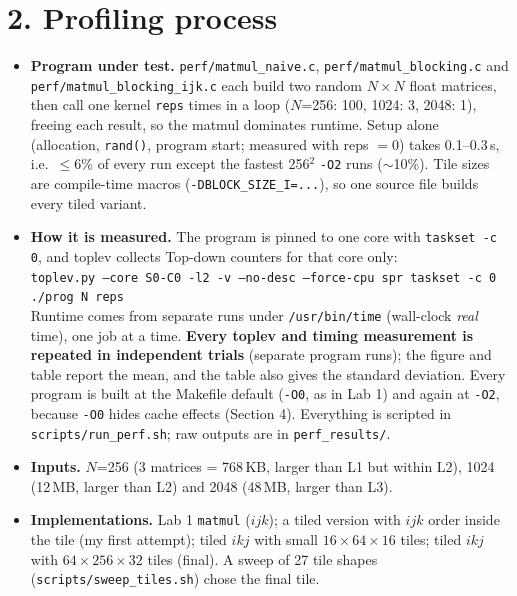 \documentclass[10pt]{article}
\begin{document}
\section*{2. Profiling process}
\begin{itemize}
\item \textbf{Program under test.} \texttt{perf/matmul\_naive.c}, \texttt{perf/matmul\_blocking.c} and \texttt{perf/matmul\_blocking\_ijk.c} each build two random $N\times N$ float matrices, then call one kernel \texttt{reps} times in a loop ($N$=256: 100, 1024: 3, 2048: 1), freeing each result, so the matmul dominates runtime. Setup alone (allocation, \texttt{rand()}, program start; measured with reps $=0$) takes 0.1--0.3\,s, i.e.\ $\le$6\% of every run except the fastest 256$^2$ \texttt{-O2} runs ($\sim$10\%). Tile sizes are compile-time macros (\texttt{-DBLOCK\_SIZE\_I=...}), so one source file builds every tiled variant.
\item \textbf{How it is measured.} The program is pinned to one core with \texttt{taskset -c 0}, and toplev collects Top-down counters for that core only:\\
\texttt{toplev.py --core S0-C0 -l2 -v --no-desc --force-cpu spr taskset -c 0 ./prog N reps}\\
Runtime comes from separate runs under \texttt{/usr/bin/time} (wall-clock \emph{real} time), one job at a time. \textbf{Every toplev and timing measurement is repeated in \toplevTrials{} independent trials} (separate program runs); the figure and table report the mean, and the table also gives the standard deviation. Every program is built at the Makefile default (\texttt{-O0}, as in Lab 1) and again at \texttt{-O2}, because \texttt{-O0} hides cache effects (Section 4). Everything is scripted in \texttt{scripts/run\_perf.sh}; raw outputs are in \texttt{perf\_results/}.
\item \textbf{Inputs.} $N$=256 (3 matrices = 768\,KB, larger than L1 but within L2), 1024 (12\,MB, larger than L2) and 2048 (48\,MB, larger than L3).
\item \textbf{Implementations.} Lab 1 \texttt{matmul} ($ijk$); a tiled version with $ijk$ order inside the tile (my first attempt); tiled $ikj$ with small $16\times64\times16$ tiles; tiled $ikj$ with $64\times256\times32$ tiles (final). A sweep of 27 tile shapes (\texttt{scripts/sweep\_tiles.sh}) chose the final tile.
\end{itemize}
\end{document}
